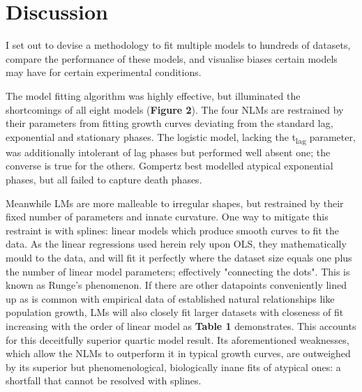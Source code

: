 \documentclass[11pt]{article}
\begin{document}





\section{Discussion}%

I set out to devise a methodology to fit multiple models to hundreds of datasets, compare the performance of these models, and visualise biases certain models may have for certain experimental conditions.

The model fitting algorithm was highly effective, but illuminated the shortcomings of all eight models (\textbf{Figure 2}). The four NLMs are restrained by their parameters from fitting growth curves deviating from the standard lag, exponential and stationary phases. The logistic model, lacking the t\textsubscript{lag} parameter, was additionally intolerant of lag phases but performed well absent one; the converse is true for the others. Gompertz best modelled atypical exponential phases, but all failed to capture death phases.

Meanwhile LMs are more malleable to irregular shapes, but restrained by their fixed number of parameters and innate curvature. One way to mitigate this restraint is with splines: linear models which produce smooth curves to fit the data.\parencite{White2017} As the linear regressions used herein rely upon OLS, they mathematically mould to the data, and will fit it perfectly where the dataset size equals one plus the number of linear model parameters; effectively "connecting the dots". This is known as Runge's phenomenon.\parencite{White2017} If there are other datapoints conveniently lined up as is common with empirical data of established natural relationships like population growth, LMs will also closely fit larger datasets with closeness of fit increasing with the order of linear model as \textbf{Table 1} demonstrates. This accounts for this deceitfully superior quartic model result. Its aforementioned weaknesses, which allow the NLMs to outperform it in typical growth curves, are outweighed by its superior but phenomenological, biologically inane fits of atypical ones: a shortfall that cannot be resolved with splines.
\end{document}
